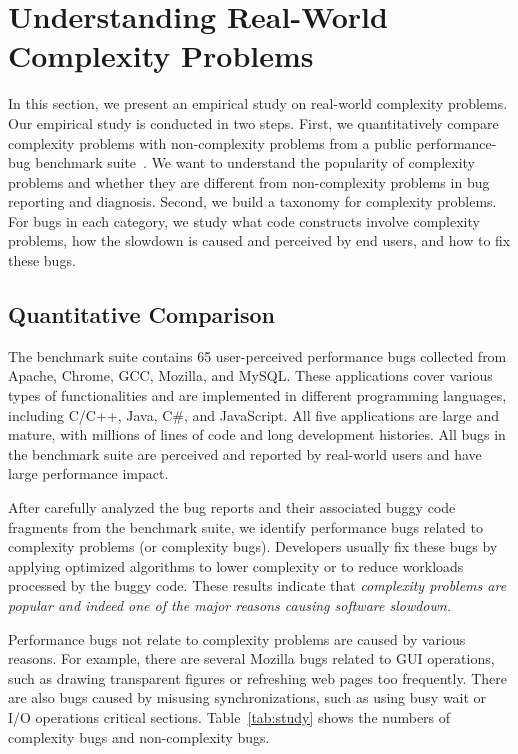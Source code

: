 \section{Understanding Real-World Complexity Problems}
\label{sec:study}



In this section, we present an empirical study on real-world 
complexity problems. Our empirical study is conducted in two steps.
First, we quantitatively compare complexity problems with non-complexity problems
from a public performance-bug benchmark suite~\cite{PerfBug,SongOOPSLA2014,ldoctor}. 
We want to understand the popularity of complexity problems 
and whether they are different from non-complexity 
problems in bug reporting and diagnosis. 
Second, we build a taxonomy for complexity problems. 
For bugs in each category, 
we study what code constructs involve complexity problems,
how the slowdown is caused and perceived by end users, 
and how to fix these bugs. 


\subsection{Quantitative Comparison}
\label{sec:compare}

The benchmark suite contains 65 user-perceived performance bugs 
collected from  Apache, Chrome, GCC, Mozilla, and MySQL. 
These applications cover various types of functionalities and are implemented 
in different programming languages, including C/C++, Java, C\#, and JavaScript. 
All  five applications are large and mature, 
with millions of lines of code and long development histories. 
All bugs in the benchmark suite are perceived and reported by real-world users
and have large performance impact. 

After carefully analyzed the bug reports and their associated buggy code fragments
from the benchmark suite,
we identify \ComBugs performance bugs related to complexity problems (or complexity
bugs). 
Developers usually fix these bugs by applying optimized algorithms to lower complexity
or to reduce workloads processed by the buggy code. 
These results indicate that \emph{complexity problems are popular and 
indeed one of the major reasons causing software slowdown.}

Performance bugs not relate to complexity problems are caused by various reasons.
For example, there are several Mozilla bugs related to GUI operations, 
such as drawing transparent figures or refreshing web pages too frequently. 
There are also bugs caused by misusing synchronizations, 
such as using busy wait or I/O operations critical sections. 
Table~\ref{tab:study} shows the numbers of complexity bugs and non-complexity bugs.


